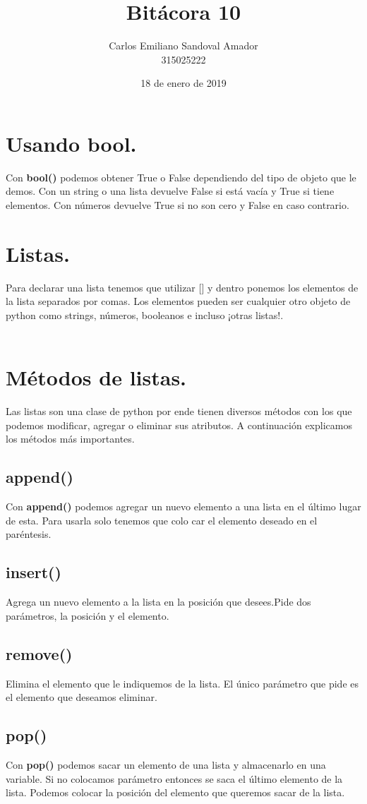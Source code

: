 \documentclass[letterpaper, 12pt, oneside]{article}%
\title{Bitácora 10}
\author{Carlos Emiliano Sandoval Amador \\ 315025222}
\date{18 de enero de 2019}
\begin{document}
	\maketitle %
	\section{\large Usando bool.}
	Con \textbf{bool()} podemos obtener True o False dependiendo del tipo de objeto que le demos. Con un string o una lista devuelve False si está vacía y True si tiene elementos. Con números devuelve True si no son cero y False en caso contrario.
	\section{\large Listas.}
	Para declarar una lista tenemos que utilizar [] y dentro ponemos los elementos de la lista separados por comas. Los elementos pueden ser cualquier otro objeto de python como strings, números, booleanos e incluso ¡otras listas!. \\ \\
	\section{Métodos de listas.}
	Las listas son una clase de python por ende tienen diversos métodos con los que podemos modificar, agregar o eliminar sus atributos. A continuación explicamos los métodos más importantes.
	\subsection{append()}
	Con \textbf{append()} podemos agregar un  nuevo elemento a una lista en el último lugar de esta. Para usarla solo tenemos que colo car el elemento deseado en el paréntesis.
	\subsection{insert()}
	Agrega un nuevo elemento a la lista en la posición que desees.Pide dos parámetros, la posición y el elemento.
	\subsection{remove()}
	Elimina el elemento que le indiquemos de la lista. El único parámetro que pide es el elemento que deseamos eliminar.
	\subsection{pop()}
	Con \textbf{pop()} podemos sacar un elemento de una lista y almacenarlo en una variable. Si no colocamos parámetro entonces se saca el último elemento de la lista. Podemos colocar la posición del elemento que queremos sacar de la lista.
\end{document}
